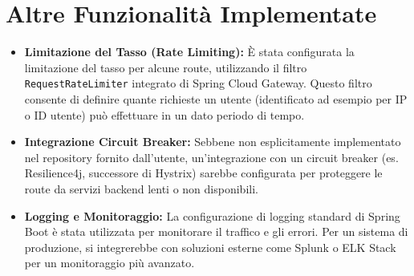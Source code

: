 \section{Altre Funzionalità Implementate}
\begin{itemize}
    \item \textbf{Limitazione del Tasso (Rate Limiting):} È stata configurata la limitazione del tasso per alcune route, utilizzando il filtro \texttt{RequestRateLimiter} integrato di Spring Cloud Gateway. Questo filtro consente di definire quante richieste un utente (identificato ad esempio per IP o ID utente) può effettuare in un dato periodo di tempo.
    
    \item \textbf{Integrazione Circuit Breaker:} Sebbene non esplicitamente implementato nel repository fornito dall'utente, un'integrazione con un circuit breaker (es. Resilience4j, successore di Hystrix) sarebbe configurata per proteggere le route da servizi backend lenti o non disponibili.
    \item \textbf{Logging e Monitoraggio:} La configurazione di logging standard di Spring Boot è stata utilizzata per monitorare il traffico e gli errori. Per un sistema di produzione, si integrerebbe con soluzioni esterne come Splunk o ELK Stack per un monitoraggio più avanzato.
\end{itemize}


